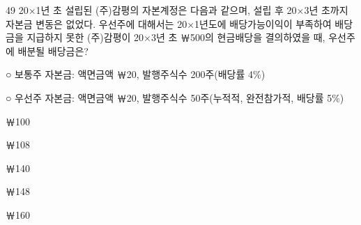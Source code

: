 \begin{question}{49}
20×1년 초 설립된 (주)감평의 자본계정은 다음과 같으며, 설립 후 20×3년 초까지 자본금 변동은 없었다. 우선주에 대해서는 20×1년도에 배당가능이익이 부족하여 배당금을 지급하지 못한 (주)감평이 20×3년 초 ￦500의 현금배당을 결의하였을 때, 우선주에 배분될 배당금은?
\begin{framedtext}
○ 보통주 자본금: 액면금액 ￦20, 발행주식수 200주(배당률 4\%) \par
○ 우선주 자본금: 액면금액 ￦20, 발행주식수 50주(누적적, 완전참가적, 배당률 5\%)
\end{framedtext}
\begin{choices}
  \item ￦100
  \item ￦108
  \item ￦140
  \item ￦148
  \item ￦160
\end{choices}
\end{question}
